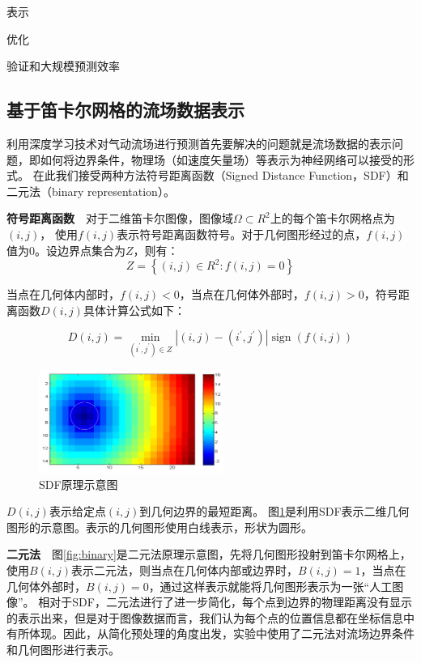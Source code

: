 表示

优化

验证和大规模预测效率


\subsection{基于笛卡尔网格的流场数据表示}
利用深度学习技术对气动流场进行预测首先要解决的问题就是流场数据的表示问题，即如何将边界条件，物理场（如速度矢量场）等表示为神经网络可以接受的形式。
在此我们接受两种方法符号距离函数（Signed Distance Function，SDF）和二元法（binary representation）。


\textbf{符号距离函数}~~对于二维笛卡尔图像，图像域$\Omega \subset R^{2}$上的每个笛卡尔网格点为$(i, j)$，
使用$f(i, j)$表示符号距离函数符号。对于几何图形经过的点，$f(i, j)$值为0。设边界点集合为$Z$，则有：
\begin{equation}Z=\left\{(i, j) \in R^{2}: f(i, j)=0\right\}\end{equation}

当点在几何体内部时，$f(i, j) < 0$，当点在几何体外部时，$f(i, j) > 0$，符号距离函数$D(i, j)$具体计算公式如下：

\begin{equation}
D(i, j)=\min _{\left(i^{\prime}, j^{\prime}\right) \in Z}\left|(i, j)-\left(i^{\prime}, j^{\prime}\right)\right| \operatorname{sign}(f(i, j))
\end{equation}


\begin{figure}[htp]
	\centering
	\includegraphics[width=0.54\textwidth]{figures/sdf.png}
	\caption{SDF原理示意图}
	\label{fig:sdf}
\end{figure}

$D(i, j)$表示给定点$(i, j)$到几何边界的最短距离。
图\ref{fig:sdf}是利用SDF表示二维几何图形的示意图。表示的几何图形使用白线表示，形状为圆形。


\textbf{二元法}~~图\ref{fig:binary}是二元法原理示意图，先将几何图形投射到笛卡尔网格上，使用$B(i, j)$表示二元法，则当点在几何体内部或边界时，$B(i, j) = 1$，当点在几何体外部时，$B(i, j) = 0$，通过这样表示就能将几何图形表示为一张“人工图像”。
相对于SDF，二元法进行了进一步简化，每个点到边界的物理距离没有显示的表示出来，但是对于图像数据而言，我们认为每个点的位置信息都在坐标信息中有所体现。因此，从简化预处理的角度出发，实验中使用了二元法对流场边界条件和几何图形进行表示。

